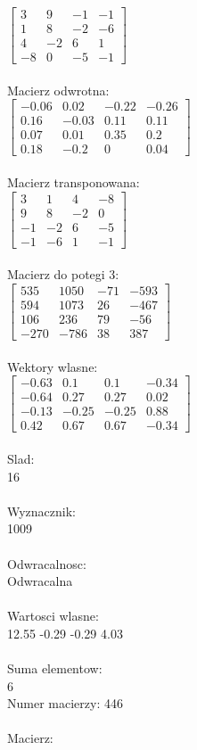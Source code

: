 \documentclass[a4paper,12pt]{article}
\begin{document}
$\begin{bmatrix} 3&9&-1&-1\\1&8&-2&-6\\4&-2&6&1\\-8&0&-5&-1 \end{bmatrix}$
\\
\\
Macierz odwrotna:\\

$\begin{bmatrix} -0.06&0.02&-0.22&-0.26\\0.16&-0.03&0.11&0.11\\0.07&0.01&0.35&0.2\\0.18&-0.2&0&0.04 \end{bmatrix}$
\\
\\
Macierz transponowana:\\

$\begin{bmatrix} 3&1&4&-8\\9&8&-2&0\\-1&-2&6&-5\\-1&-6&1&-1 \end{bmatrix}$
\\
\\
Macierz do potegi 3:\\

$\begin{bmatrix} 535&1050&-71&-593\\594&1073&26&-467\\106&236&79&-56\\-270&-786&38&387 \end{bmatrix}$
\\
\\
Wektory wlasne:\\

$\begin{bmatrix} -0.63&0.1&0.1&-0.34\\-0.64&0.27&0.27&0.02\\-0.13&-0.25&-0.25&0.88\\0.42&0.67&0.67&-0.34 \end{bmatrix}$
\\
\\
Slad:\\
16
\\
\\
Wyznacznik:\\
1009
\\
\\
Odwracalnosc:\\
Odwracalna
\\
\\
Wartosci wlasne:\\
12.55 -0.29 -0.29 4.03
\\
\\
Suma elementow:\\
6
\\
\newpage
Numer macierzy:
446
\\
\\
Macierz:\\
\end{document}
